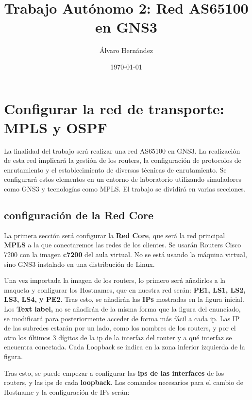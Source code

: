 \documentclass{article}
\title{Trabajo Autónomo 2: Red AS65100 en GNS3}
\author{Álvaro Hernández}
\date{\today}
\begin{document}

\maketitle
\tableofcontents
\newpage

\section{Configurar la red de transporte: MPLS y OSPF}

La finalidad del trabajo será realizar una red AS65100 en GNS3. La  realización de esta red implicará la gestión de los routers, la configuración de protocolos de enrutamiento y el establecimiento de diversas técnicas de enrutamiento. Se configurará estos elementos en un entorno de laboratorio utilizando simuladores como GNS3 y tecnologías como MPLS. El trabajo se dividirá en varias secciones.

\subsection{configuración de la Red Core}

La primera sección será configurar la \textbf{Red Core}, que será la red principal \textbf{MPLS} a la que conectaremos las redes de los clientes. Se usarán Routers Cisco 7200 con la imagen \textbf{c7200} del aula virtual. No se está usando la máquina virtual, sino GNS3 instalado en una distribución de Linux.

\quad

Una vez importada la imagen de los routers, lo primero será añadirlos a la maqueta y configurar los Hostnames, que en nuestra red serán: \textbf{PE1, LS1, LS2, LS3, LS4, y PE2}. Tras esto, se añadirán las \textbf{IPs} mostradas en la figura inicial. Los \textbf{Text label,} no se añadirán de la misma forma que la figura del enunciado, se modificará para posteriormente acceder de forma más fácil a cada ip. Las IP de las subredes estarán por un lado, como los nombres de los routers, y por el otro los últimos 3 dígitos de la ip de la interfaz del router y a qué interfaz se encuentra conectada. Cada Loopback se indica en la zona inferior izquierda de la figura.

Tras esto, se puede empezar a configurar las \textbf{ips de las interfaces} de los routers, y las ips de cada \textbf{loopback}.
Los comandos necesarios para el cambio de Hostname y la configuración de IPs serán:
\end{document}
